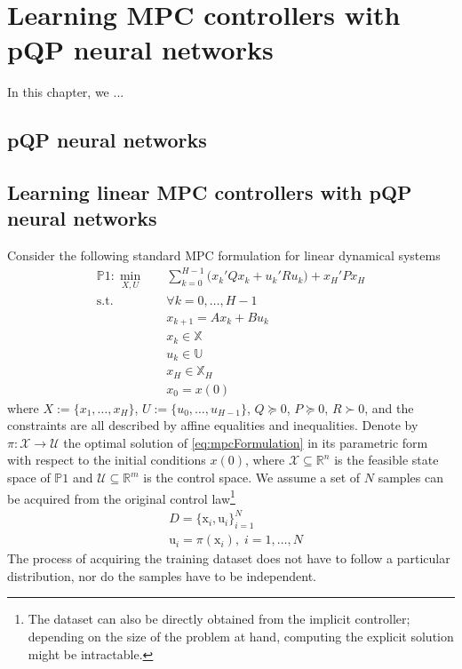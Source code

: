 \cleardoublepage
\chapter{Learning MPC controllers with pQP neural networks}

In this chapter, we ...

\section{pQP neural networks}

\section{Learning linear MPC controllers with pQP neural networks}

Consider the following standard MPC formulation for linear dynamical systems
\begin{subequations}
	\label{eq:mpcFormulation}
	\begin{align}
		\mathds{P}1: \min_{X,U} \quad & \sum_{k=0}^{H-1} \big( x_k' Q x_k + u_k' R u_k \big) + x_H' P x_H\\
		\text{s.t.} \quad & \forall k = 0,\dots,H-1 \\
		& x_{k+1} = A x_{k} + B u_{k} \\
		& x_{k} \in \mathbb{X} \\
		& u_{k} \in \mathbb{U} \\
		& x_{H} \in \mathbb{X}_H \\
		& x_0 = x(0)
	\end{align}
\end{subequations}
where $X:=\{x_1,\dots,x_{H}\}$, $U:=\{u_0,\dots,u_{H-1}\}$, $Q \succeq 0$, $P \succeq 0$, $R \succ 0$, and the constraints are all described by affine equalities and inequalities. Denote by $\pi: \mathcal{X} \rightarrow \mathcal{U}$ the optimal solution of \eqref{eq:mpcFormulation} in its parametric form with respect to the initial conditions $x(0)$, where $\mathcal{X} \subseteq \mathbb{R}^n$ is the feasible state space of $\mathds{P}1$ and $\mathcal{U} \subseteq \mathbb{R}^m$ is the control space. We assume a set of $N$ samples can be acquired from the original control law\footnote{The dataset can also be directly obtained from the implicit controller; depending on the size of the problem at hand, computing the explicit solution might be intractable.}
\begin{subequations}
	\begin{align}
		& D = \{\text{x}_i,\text{u}_i\}_{i=1}^{N} \\[3pt]
		& \text{u}_i = \pi(\text{x}_i), \; i=1,\dots,N
	\end{align}
\end{subequations}
The process of acquiring the training dataset does not have to follow a particular distribution, nor do the samples have to be independent.

